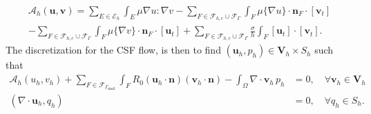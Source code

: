 \documentclass[fleqn,10pt]{wlscirep}
\begin{document}
\begin{multline}
\mathcal{A}_h (\bm u, \bm v) = \sum_{E \in \mathcal{E}_h} \int_{E} \mu \nabla u : \nabla v - \sum_{
F \in \mathcal{F}_{h,c} \cup \mathcal{F}_{\Gamma} 
} \int_{F} \mu \{\nabla u\}\cdot \bm n_F \cdot [\bm v_t] 
\\ - \sum_{
F \in \mathcal{F}_{h,c} \cup \mathcal{F}_{\Gamma} 
} \int_{F} \mu \{\nabla v\}\cdot \bm n_F \cdot [\bm u_t]
+ \sum_{
F \in \mathcal{F}_{h,c} \cup \mathcal{F}_{\Gamma} 
} \frac{\sigma}{h} \int_{F} [\bm u_t ] \cdot [\bm v_t].   
\end{multline}
The discretization for the CSF flow, is then to find $(\bm u_h, p_h) \in \bm V_h \times S_h$ such  that 
\begin{align}
\mathcal{A}_h(u_h, v_h)  + \sum_{F \in \mathcal{F}_{\Gamma_{\mathrm{skull}}}} \int_{F} R_0 (\bm u_h \cdot \bm n) (\bm v_h \cdot \bm n) - \int_{\Omega} \nabla \cdot \bm v_h \, p_h  & = 0, \quad \forall \bm v_h \in \bm V_h   \\ 
(\nabla \cdot \bm u_h , q_h ) & = 0, \quad \forall q_h \in S_h.
\end{align}
\end{document}
